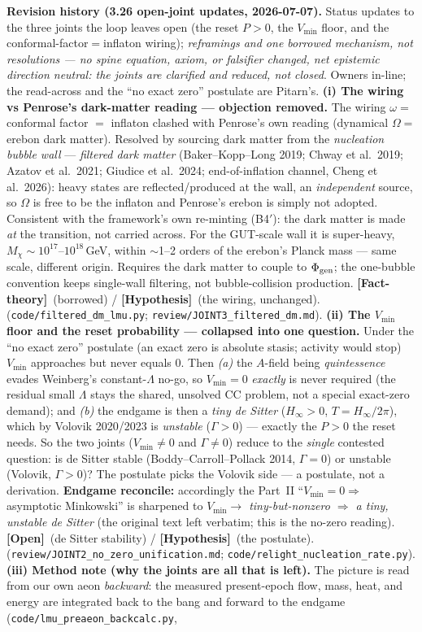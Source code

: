\documentclass[11pt]{article}
\newcommand{\factth}{\textcolor{green!40!black}{\textbf{[Fact-theory]}}}
\newcommand{\hyp}{\textcolor{orange!80!black}{\textbf{[Hypothesis]}}}
\newcommand{\open}{\textcolor{red!70!black}{\textbf{[Open]}}}
\begin{document}
{\smallskip\noindent\textbf{Revision history (3.26 open-joint updates, 2026-07-07).} Status updates to the three joints the loop leaves open (the reset $P>0$, the $V_{\min}$ floor, and the conformal-factor$=$inflaton wiring); \emph{reframings and one borrowed mechanism, not resolutions --- no spine equation, axiom, or falsifier changed, net epistemic direction neutral: the joints are clarified and reduced, not closed}. Owners in-line; the read-across and the ``no exact zero'' postulate are Pitarn's. \textbf{(i) The wiring vs Penrose's dark-matter reading --- objection removed.} The wiring $\omega=$ conformal factor $=$ inflaton clashed with Penrose's own reading (dynamical $\Omega=$ erebon dark matter). Resolved by sourcing dark matter from the \emph{nucleation bubble wall} --- \emph{filtered dark matter} (Baker--Kopp--Long 2019; Chway et al.\ 2019; Azatov et al.\ 2021; Giudice et al.\ 2024; end-of-inflation channel, Cheng et al.\ 2026): heavy states are reflected/produced at the wall, an \emph{independent} source, so $\Omega$ is free to be the inflaton and Penrose's erebon is simply not adopted. Consistent with the framework's own re-minting (B4$'$): the dark matter is made \emph{at} the transition, not carried across. For the GUT-scale wall it is super-heavy, $M_\chi\!\sim\!10^{17}$--$10^{18}$\,GeV, within $\sim$1--2 orders of the erebon's Planck mass --- same scale, different origin. Requires the dark matter to couple to $\Phi_{\rm gen}$; the one-bubble convention keeps single-wall filtering, not bubble-collision production. \factth\ (borrowed) / \hyp\ (the wiring, unchanged). (\texttt{code/filtered\_dm\_lmu.py}; \texttt{review/JOINT3\_filtered\_dm.md}). \textbf{(ii) The $V_{\min}$ floor and the reset probability --- collapsed into one question.} Under the ``no exact zero'' postulate (an exact zero is absolute stasis; activity would stop) $V_{\min}$ approaches but never equals $0$. Then \emph{(a)} the $A$-field being \emph{quintessence} evades Weinberg's constant-$\Lambda$ no-go, so $V_{\min}=0$ \emph{exactly} is never required (the residual small $\Lambda$ stays the shared, unsolved CC problem, not a special exact-zero demand); and \emph{(b)} the endgame is then a \emph{tiny de Sitter} ($H_\infty>0$, $T=H_\infty/2\pi$), which by Volovik 2020/2023 is \emph{unstable} ($\Gamma>0$) --- exactly the $P>0$ the reset needs. So the two joints ($V_{\min}\neq0$ and $\Gamma\neq0$) reduce to the \emph{single} contested question: is de Sitter stable (Boddy--Carroll--Pollack 2014, $\Gamma=0$) or unstable (Volovik, $\Gamma>0$)? The postulate picks the Volovik side --- a postulate, not a derivation. \textbf{Endgame reconcile:} accordingly the Part~II ``$V_{\min}=0\Rightarrow$ asymptotic Minkowski'' is sharpened to \emph{$V_{\min}\to$ tiny-but-nonzero $\Rightarrow$ a tiny, unstable de Sitter} (the original text left verbatim; this is the no-zero reading). \open\ (de Sitter stability) / \hyp\ (the postulate). (\texttt{review/JOINT2\_no\_zero\_unification.md}; \texttt{code/relight\_nucleation\_rate.py}). \textbf{(iii) Method note (why the joints are all that is left).} The picture is read from our own aeon \emph{backward}: the measured present-epoch flow, mass, heat, and energy are integrated back to the bang and forward to the endgame (\texttt{code/lmu\_preaeon\_backcalc.py}, }
\end{document}
